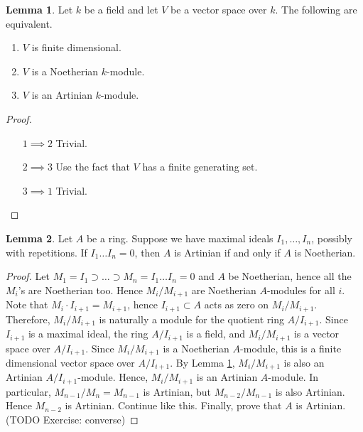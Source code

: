\documentclass{article}
\theoremstyle{definition}\newtheorem{definition}{Definition}[section]
\theoremstyle{definition}\newtheorem{remark}[definition]{Remark}
\theoremstyle{definition}\newtheorem*{example}{Example}
\theoremstyle{definition}\newtheorem*{note}{Note}
\newtheorem{lemma}[definition]{Lemma}
\begin{document}

\begin{lemma}
\label{lem:12.11}
Let $ k $ be a field and let $ V $ be a vector space over $ k $. The following are equivalent.
\begin{enumerate}
\item $ V $ is finite dimensional.
\item $ V $ is a Noetherian $ k $-module.
\item $ V $ is an Artinian $ k $-module.
\end{enumerate}
\end{lemma}

\begin{proof}
\hfill
\begin{itemize}[leftmargin=2cm]
\item[$ 1 \implies 2 $] Trivial.
\item[$ 2 \implies 3 $] Use the fact that $ V $ has a finite generating set.
\item[$ 3 \implies 1 $] Trivial.
\end{itemize}
\end{proof}

\begin{lemma}
\label{lem:12.12}
Let $ A $ be a ring. Suppose we have maximal ideals $ I_1, \dots, I_n $, possibly with repetitions. If $ I_1 \dots I_n = 0 $, then $ A $ is Artinian if and only if $ A $ is Noetherian.
\end{lemma}

\begin{proof}
Let $ M_1 = I_1 \supset \dots \supset M_n = I_1 \dots I_n = 0 $ and $ A $ be Noetherian, hence all the $ M_i $'s are Noetherian too. Hence $ M_i / M_{i + 1} $ are Noetherian $ A $-modules for all $ i $. Note that $ M_i \cdot I_{i + 1} = M_{i + 1} $, hence $ I_{i + 1} \subset A $ acts as zero on $ M_i / M_{i + 1} $. Therefore, $ M_i / M_{i + 1} $ is naturally a module for the quotient ring $ A / I_{i + 1} $. Since $ I_{i + 1} $ is a maximal ideal, the ring $ A / I_{i + 1} $ is a field, and $ M_i / M_{i + 1} $ is a vector space over $ A / I_{i + 1} $. Since $ M_i / M_{i + 1} $ is a Noetherian $ A $-module, this is a finite dimensional vector space over $ A / I_{i + 1} $. By Lemma \ref{lem:12.11}, $ M_i / M_{i + 1} $ is also an Artinian $ A / I_{i + 1} $-module. Hence, $ M_i / M_{i + 1} $ is an Artinian $ A $-module. In particular, $ M_{n - 1} / M_n = M_{n - 1} $ is Artinian, but $ M_{n - 2} / M_{n - 1} $ is also Artinian. Hence $ M_{n - 2} $ is Artinian. Continue like this. Finally, prove that $ A $ is Artinian. (TODO Exercise: converse)
\end{proof}
\end{document}
